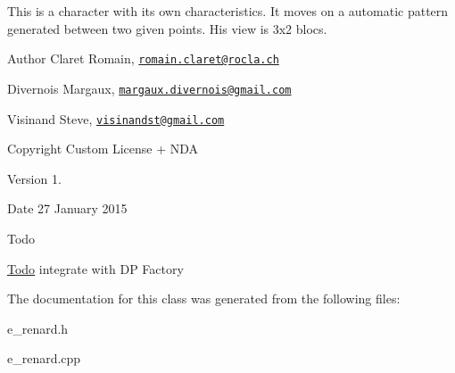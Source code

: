 This is a character with its own characteristics. It moves on a automatic pattern generated between two given points. His view is 3x2 blocs. \begin{DoxyAuthor}{Author}
Claret Romain, \href{mailto:romain.claret@rocla.ch}{\tt romain.\+claret@rocla.\+ch} 

Divernois Margaux, \href{mailto:margaux.divernois@gmail.com}{\tt margaux.\+divernois@gmail.\+com} 

Visinand Steve, \href{mailto:visinandst@gmail.com}{\tt visinandst@gmail.\+com} 
\end{DoxyAuthor}
\begin{DoxyCopyright}{Copyright}
Custom License + N\+D\+A 
\end{DoxyCopyright}
\begin{DoxyVersion}{Version}
1. 
\end{DoxyVersion}
\begin{DoxyDate}{Date}
27 January 2015 
\end{DoxyDate}
\begin{DoxyRefDesc}{Todo}
\item[\hyperlink{todo__todo000003}{Todo}]integrate with D\+P Factory \end{DoxyRefDesc}


The documentation for this class was generated from the following files\+:\begin{DoxyCompactItemize}
\item 
e\+\_\+renard.\+h\item 
e\+\_\+renard.\+cpp\end{DoxyCompactItemize}
